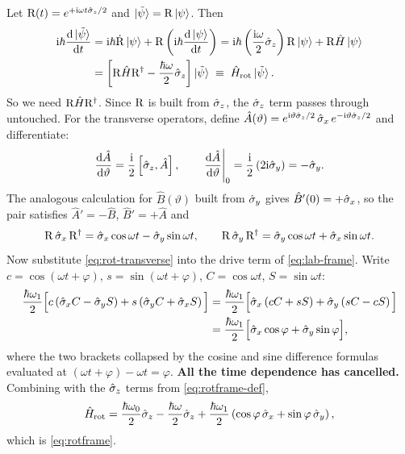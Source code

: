 Let $\mathrm{R}(t) = e^{+\mathrm{i}\omega t\hat{\sigma}_z/2}$ and $\ket{\tilde\psi} = \mathrm{R}\ket{\psi}$. Then
%
\begin{align}
\mathrm{i}\hbar\frac{\mathrm{d}\ket{\tilde\psi}}{\mathrm{d} t}
 &= \mathrm{i}\hbar\dot{\mathrm{R}}\ket{\psi} + \mathrm{R}\left(\mathrm{i}\hbar\frac{\mathrm{d}\ket{\psi}}{\mathrm{d} t}\right)
  = \mathrm{i}\hbar\left(\frac{\mathrm{i}\omega}{2}\hat{\sigma}_z\right)\mathrm{R}\ket{\psi} + \mathrm{R}\hat{H}\ket{\psi} \nonumber\\
 &= \left[\mathrm{R}\hat{H}\mathrm{R}^{\dagger} - \frac{\hbar\omega}{2}\hat{\sigma}_z\right]\ket{\tilde\psi}
  \;\equiv\; \hat{H}_{\rm rot}\ket{\tilde\psi}.
\label{eq:rotframe-def}
\end{align}
%
So we need $\mathrm{R}\hat{H}\mathrm{R}^\dagger$. Since $\mathrm{R}$ is built from $\hat{\sigma}_z$, the $\hat{\sigma}_z$ term passes
through untouched. For the transverse operators, define
$\hat{A}(\vartheta) = e^{\mathrm{i}\vartheta\hat{\sigma}_z/2}\,\hat{\sigma}_x\,e^{-\mathrm{i}\vartheta\hat{\sigma}_z/2}$ and
differentiate:
%
\begin{equation}
\frac{\mathrm{d}\hat{A}}{\mathrm{d}\vartheta} = \frac{\mathrm{i}}{2}\left[\hat{\sigma}_z,\hat{A}\right],
\qquad
\left.\frac{\mathrm{d}\hat{A}}{\mathrm{d}\vartheta}\right|_{0} = \frac{\mathrm{i}}{2}\left(2\mathrm{i}\hat{\sigma}_y\right) = -\hat{\sigma}_y .
\end{equation}
%
The analogous calculation for $\hat{B}(\vartheta)$ built from $\hat{\sigma}_y$ gives
$\hat{B}'(0) = +\hat{\sigma}_x$, so the pair satisfies $\hat{A}'=-\hat{B}$, $\hat{B}'=+\hat{A}$ and
%
\begin{equation}
\mathrm{R}\,\hat{\sigma}_x\,\mathrm{R}^{\dagger} = \hat{\sigma}_x\cos\omega t - \hat{\sigma}_y\sin\omega t,
\qquad
\mathrm{R}\,\hat{\sigma}_y\,\mathrm{R}^{\dagger} = \hat{\sigma}_y\cos\omega t + \hat{\sigma}_x\sin\omega t.
\label{eq:rot-transverse}
\end{equation}
%
Now substitute \cref{eq:rot-transverse} into the drive term of \cref{eq:lab-frame}. Write
$c=\cos(\omega t+\varphi)$, $s=\sin(\omega t+\varphi)$, $C=\cos\omega t$,
$S=\sin\omega t$:
%
\begin{align}
\frac{\hbar\omega_1}{2}\Big[c\left(\hat{\sigma}_x C - \hat{\sigma}_y S\right) + s\left(\hat{\sigma}_y C + \hat{\sigma}_x S\right)\Big]
&= \frac{\hbar\omega_1}{2}\Big[\hat{\sigma}_x\left(cC+sS\right) + \hat{\sigma}_y\left(sC-cS\right)\Big] \nonumber\\
&= \frac{\hbar\omega_1}{2}\Big[\hat{\sigma}_x\cos\varphi + \hat{\sigma}_y\sin\varphi\Big],
\end{align}
%
where the two brackets collapsed by the cosine and sine difference formulas evaluated at
$(\omega t+\varphi)-\omega t = \varphi$. \textbf{All the time dependence has cancelled.}
Combining with the $\hat{\sigma}_z$ terms from \cref{eq:rotframe-def},
%
\begin{equation}
\hat{H}_{\rm rot} = \frac{\hbar\omega_0}{2}\hat{\sigma}_z - \frac{\hbar\omega}{2}\hat{\sigma}_z
 + \frac{\hbar\omega_1}{2}\left(\cos\varphi\,\hat{\sigma}_x+\sin\varphi\,\hat{\sigma}_y\right),
\end{equation}
%
which is \cref{eq:rotframe}.

